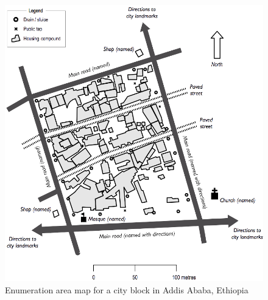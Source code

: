 \documentclass[12pt,a4paper]{book}
\theoremstyle{definition}
\theoremstyle{definition}
\theoremstyle{definition}
\theoremstyle{remark}
\begin{document}
\begin{figure}[H]

{\centering \includegraphics{figures/stage2sample12} 

}

\caption{Enumeration area map for a city block in Addis Ababa, Ethiopia}\label{fig:sample26}
\end{figure}
\end{document}
